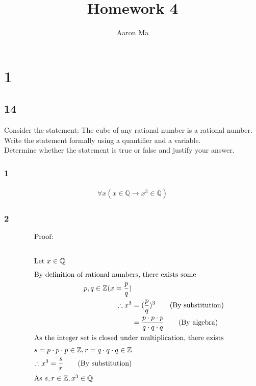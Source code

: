 \documentclass{article}
\title{Homework 4}
\author{Aaron Ma}
\begin{document}
\maketitle

\section{1}
\subsection{14}
Consider the statement: The cube of any rational number is a rational number.\\
Write the statement formally using a quantifier and a variable.\\
Determine whether the statement is true or false and justify your answer.

\subsubsection{1}
\begin{align*}
    \forall x(x\in \mathbb{Q} \rightarrow x^3 \in \mathbb{Q})
\end{align*}
\subsubsection{2}
\begin{align*}
    \intertext{Proof:}\\
    \intertext{Let $x \in \mathbb{Q}$}
    \intertext{By definition of rational numbers, there exists some}
    p,q \in \mathbb{Z}(x = \frac{p}{q}) \\
    \therefore x^3 &= (\frac{p}{q})^3 \tag{By substitution}\\
    &= \frac{p \cdot p \cdot p}{q \cdot q \cdot q}\tag{By algebra}\\
    \intertext{As the integer set is closed under multiplication, there exists}
    s = p \cdot p \cdot p \in \mathbb{Z}, r = q \cdot q \cdot q \in \mathbb{Z}\\
    \therefore x^3 = \frac{s}{r}\tag{By substitution}\\
    \intertext{As $s,r \in \mathbb{Z}, x^3 \in \mathbb{Q}$}
\end{align*}
\end{document}
